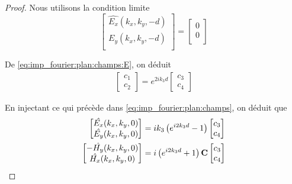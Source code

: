         \begin{proof}
            Nous utilisons la condition limite
            \begin{equation}
                \begin{bmatrix}
                    \hat{E_x}(k_x,k_y,-d)\\
                    \hat{E_y}(k_x,k_y,-d)\\
                \end{bmatrix}
                =
                \begin{bmatrix}
                    0\\
                    0\\
                \end{bmatrix}
            \end{equation}

            De \eqref{eq:imp_fourier:plan:champs:E}, on déduit
            \begin{align}
                \begin{bmatrix}
                    c_1 \\
                    c_2
                \end{bmatrix}
                = e^{2ik_3 d}
                \begin{bmatrix}
                    c_3 \\
                    c_4
                \end{bmatrix}
            \end{align}

            En injectant ce qui précède dans \eqref{eq:imp_fourier:plan:champs}, on déduit que
            \begin{align}
                \begin{bmatrix}
                    \hat{E_x}(k_x,k_y,0)\\
                    \hat{E_y}(k_x,k_y,0)\\
                \end{bmatrix}
                &=ik_3\left( e^{i2k_3 d} -1 \right)
                \begin{bmatrix}
                    c_3 \\
                    c_4
                \end{bmatrix} \\
                \begin{bmatrix}
                    -\hat{H_y}(k_x,k_y,0)\\
                    \hat{H_x}(k_x,k_y,0)\\
                \end{bmatrix}
                & = i\left(e^{i2k_3 d} +1 \right)
                \mathbf{C}
                \begin{bmatrix}
                c_3 \\
                c_4
                \end{bmatrix}
            \end{align}


\end{proof}
